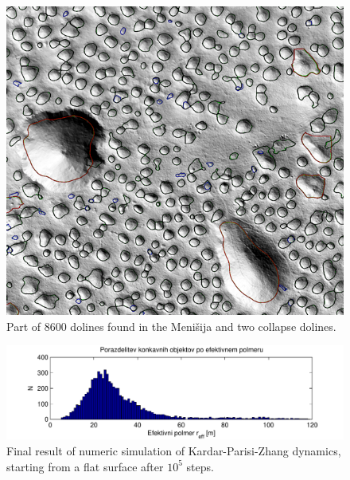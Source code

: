 \documentclass[a0,portrait]{a0poster}
\begin{document}
\begin{multicols}{2}
	\begin{minipage}[b]{0.5\textwidth}
	\centering
      \begin{minipage}{0.18\linewidth}
          \begin{figure}[H]
              \includegraphics[width=\textwidth]{menisija-vrtace}
              \caption{Part of 8600 dolines found in the Menišija and two collapse dolines.}
              \label{fig:vrtaceinpolmeri}
          \end{figure}
      \end{minipage}
      \hspace{0.05\linewidth}
      \begin{minipage}{0.75\linewidth}
          \begin{figure}[H]
              \includegraphics[width=\textwidth]{menisija-polmeri-hist}
              \caption{Final result of numeric simulation of Kardar-Parisi-Zhang dynamics, starting from a flat surface after $10^5$ steps.}
              \label{fig:vrtave-histogram}
          \end{figure}
      \end{minipage}
	\end{minipage}


\end{multicols}
\end{document}
